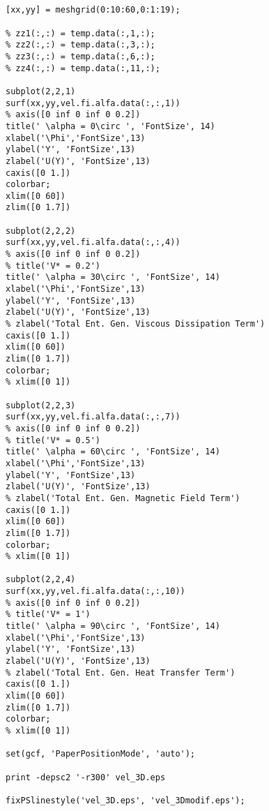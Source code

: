   \begin{lstlisting}
  
  
[xx,yy] = meshgrid(0:10:60,0:1:19);

% zz1(:,:) = temp.data(:,1,:);
% zz2(:,:) = temp.data(:,3,:);
% zz3(:,:) = temp.data(:,6,:);
% zz4(:,:) = temp.data(:,11,:);

subplot(2,2,1) 
surf(xx,yy,vel.fi.alfa.data(:,:,1))
% axis([0 inf 0 inf 0 0.2])
title(' \alpha = 0\circ ', 'FontSize', 14)
xlabel('\Phi','FontSize',13)
ylabel('Y', 'FontSize',13)
zlabel('U(Y)', 'FontSize',13)
caxis([0 1.])
colorbar;
xlim([0 60])
zlim([0 1.7])

subplot(2,2,2) 
surf(xx,yy,vel.fi.alfa.data(:,:,4))
% axis([0 inf 0 inf 0 0.2])
% title('V* = 0.2')
title(' \alpha = 30\circ ', 'FontSize', 14)
xlabel('\Phi','FontSize',13)
ylabel('Y', 'FontSize',13)
zlabel('U(Y)', 'FontSize',13)
% zlabel('Total Ent. Gen. Viscous Dissipation Term')
caxis([0 1.])
xlim([0 60])
zlim([0 1.7])
colorbar;
% xlim([0 1])

subplot(2,2,3) 
surf(xx,yy,vel.fi.alfa.data(:,:,7))
% axis([0 inf 0 inf 0 0.2])
% title('V* = 0.5')
title(' \alpha = 60\circ ', 'FontSize', 14)
xlabel('\Phi','FontSize',13)
ylabel('Y', 'FontSize',13)
zlabel('U(Y)', 'FontSize',13)
% zlabel('Total Ent. Gen. Magnetic Field Term')
caxis([0 1.])
xlim([0 60])
zlim([0 1.7])
colorbar;
% xlim([0 1])

subplot(2,2,4) 
surf(xx,yy,vel.fi.alfa.data(:,:,10))
% axis([0 inf 0 inf 0 0.2])
% title('V* = 1')
title(' \alpha = 90\circ ', 'FontSize', 14)
xlabel('\Phi','FontSize',13)
ylabel('Y', 'FontSize',13)
zlabel('U(Y)', 'FontSize',13)
% zlabel('Total Ent. Gen. Heat Transfer Term')
caxis([0 1.])
xlim([0 60])
zlim([0 1.7])
colorbar;
% xlim([0 1])

set(gcf, 'PaperPositionMode', 'auto');

print -depsc2 '-r300' vel_3D.eps

fixPSlinestyle('vel_3D.eps', 'vel_3Dmodif.eps');

  \end{lstlisting}
  
 \begin{lstlisting}
\end{lstlisting}



\newpage







